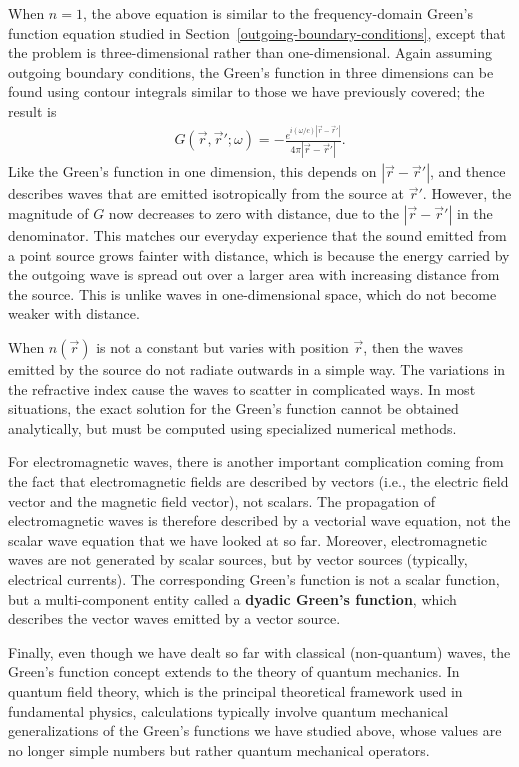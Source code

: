 \documentclass[10pt,a4paper]{article}
\begin{document}
When $n = 1$, the above equation is similar to the frequency-domain
Green's function equation studied in
Section~\ref{outgoing-boundary-conditions}, except that the problem is
three-dimensional rather than one-dimensional. Again assuming outgoing
boundary conditions, the Green's function in three dimensions can be
found using contour integrals similar to those we have previously
covered; the result is
\begin{align}
  G(\vec{r},\vec{r}';\omega) = -\frac{e^{i(\omega/c)|\vec{r}-\vec{r}'|}}{4\pi|\vec{r}-\vec{r}'|}.
\end{align}
Like the Green's function in one dimension, this depends on
$|\vec{r}-\vec{r}'|$, and thence describes waves that are emitted
isotropically from the source at $\vec{r}'$. However, the magnitude of
$G$ now decreases to zero with distance, due to the
$|\vec{r}-\vec{r}'|$ in the denominator. This matches our everyday
experience that the sound emitted from a point source grows fainter
with distance, which is because the energy carried by the outgoing
wave is spread out over a larger area with increasing distance from
the source. This is unlike waves in one-dimensional space, which do
not become weaker with distance.

When $n(\vec{r})$ is not a constant but varies with position
$\vec{r}$, then the waves emitted by the source do not radiate
outwards in a simple way. The variations in the refractive index cause
the waves to scatter in complicated ways. In most situations, the
exact solution for the Green's function cannot be obtained
analytically, but must be computed using specialized numerical
methods.

For electromagnetic waves, there is another important complication
coming from the fact that electromagnetic fields are described by
vectors (i.e., the electric field vector and the magnetic field
vector), not scalars.  The propagation of electromagnetic waves is
therefore described by a vectorial wave equation, not the scalar wave
equation that we have looked at so far. Moreover, electromagnetic
waves are not generated by scalar sources, but by vector sources
(typically, electrical currents). The corresponding Green's function
is not a scalar function, but a multi-component entity called a
\textbf{dyadic Green's function}, which describes the vector waves
emitted by a vector source.

Finally, even though we have dealt so far with classical (non-quantum)
waves, the Green's function concept extends to the theory of quantum
mechanics. In quantum field theory, which is the principal theoretical
framework used in fundamental physics, calculations typically involve
quantum mechanical generalizations of the Green's functions we have
studied above, whose values are no longer simple numbers but rather
quantum mechanical operators.
\end{document}
